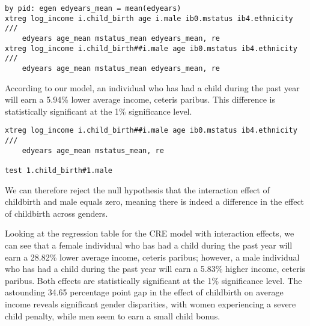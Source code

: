 \begin{verbatim}
by pid: egen edyears_mean = mean(edyears)
xtreg log_income i.child_birth age i.male ib0.mstatus ib4.ethnicity ///
    edyears age_mean mstatus_mean edyears_mean, re
xtreg log_income i.child_birth##i.male age ib0.mstatus ib4.ethnicity ///
    edyears age_mean mstatus_mean edyears_mean, re
\end{verbatim}

According to our model, an individual who has had a child during the past year will earn a 5.94\% lower average income, ceteris paribus. This difference is statistically significant at the 1\% significance level.


\begin{verbatim}
xtreg log_income i.child_birth##i.male age ib0.mstatus ib4.ethnicity ///
    edyears age_mean mstatus_mean, re

test 1.child_birth#1.male
\end{verbatim}


We can therefore reject the null hypothesis that the interaction effect of childbirth and male equals zero, meaning there is indeed a difference in the effect of childbirth across genders.



Looking at the regression table for the CRE model with interaction effects, we can see that a female individual who has had a child during the past year will earn a 28.82\% lower average income, ceteris paribus; however, a male individual who has had a child during the past year will earn a 5.83\% higher income, ceteris paribus. Both effects are statistically significant at the 1\% significance level. The astounding 34.65 percentage point gap in the effect of childbirth on average income reveals significant gender disparities, with women experiencing a severe child penalty, while men seem to earn a small child bonus.